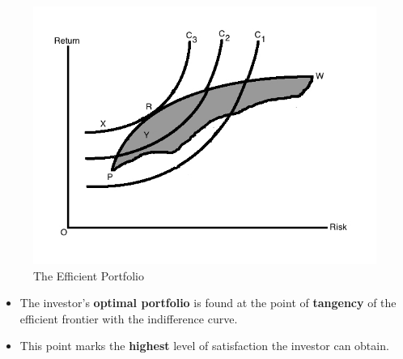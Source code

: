 \documentclass{beamer}
\begin{document}
\begin{frame}

\begin{figure}
	\centering
	\includegraphics[scale = 0.3]{fig3.jpg}
	\caption{The Efficient Portfolio}
	\label{fig:fig3}
\end{figure}

\justifying
\begin{itemize}
	\justifying
	\item The investor's \textbf{optimal portfolio} is found at the point of \textbf{tangency} of the efficient frontier with the indifference curve.
	\item This point marks the \textbf{highest} level of satisfaction the investor can obtain.
\end{itemize}


\end{frame}






\end{document}
